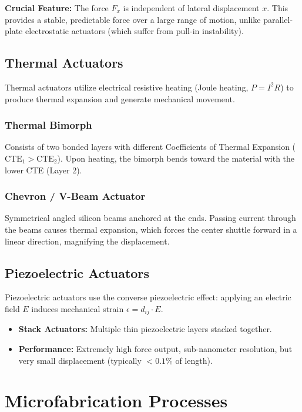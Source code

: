 \documentclass[12pt,a4paper]{article}
\begin{document}
\textbf{Crucial Feature:} The force $F_x$ is independent of lateral displacement $x$. This provides a stable, predictable force over a large range of motion, unlike parallel-plate electrostatic actuators (which suffer from pull-in instability).

\subsection{Thermal Actuators}
Thermal actuators utilize electrical resistive heating (Joule heating, $P = I^2 R$) to produce thermal expansion and generate mechanical movement.

\subsubsection{Thermal Bimorph}
Consists of two bonded layers with different Coefficients of Thermal Expansion ($\text{CTE}_1 > \text{CTE}_2$). Upon heating, the bimorph bends toward the material with the lower CTE (Layer 2).

\subsubsection{Chevron / V-Beam Actuator}
Symmetrical angled silicon beams anchored at the ends. Passing current through the beams causes thermal expansion, which forces the center shuttle forward in a linear direction, magnifying the displacement.

\subsection{Piezoelectric Actuators}
Piezoelectric actuators use the converse piezoelectric effect: applying an electric field $E$ induces mechanical strain $\epsilon = d_{ij} \cdot E$.
\begin{itemize}[leftmargin=*]
  \item \textbf{Stack Actuators:} Multiple thin piezoelectric layers stacked together.
  \item \textbf{Performance:} Extremely high force output, sub-nanometer resolution, but very small displacement (typically $< 0.1\%$ of length).
\end{itemize}

\section{Microfabrication Processes}
\end{document}
